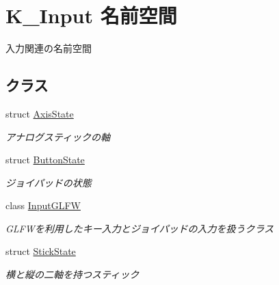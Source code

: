 \hypertarget{namespace_k___input}{}\section{K\+\_\+\+Input 名前空間}
\label{namespace_k___input}


入力関連の名前空間  


\subsection*{クラス}
\begin{DoxyCompactItemize}
\item 
struct \mbox{\hyperlink{struct_k___input_1_1_axis_state}{Axis\+State}}
\begin{DoxyCompactList}\small\item\em アナログスティックの軸 \end{DoxyCompactList}\item 
struct \mbox{\hyperlink{struct_k___input_1_1_button_state}{Button\+State}}
\begin{DoxyCompactList}\small\item\em ジョイパッドの状態 \end{DoxyCompactList}\item 
class \mbox{\hyperlink{class_k___input_1_1_input_g_l_f_w}{Input\+G\+L\+FW}}
\begin{DoxyCompactList}\small\item\em G\+L\+F\+Wを利用したキー入力とジョイパッドの入力を扱うクラス \end{DoxyCompactList}\item 
struct \mbox{\hyperlink{struct_k___input_1_1_stick_state}{Stick\+State}}
\begin{DoxyCompactList}\small\item\em 横と縦の二軸を持つスティック \end{DoxyCompactList}\end{DoxyCompactItemize}
